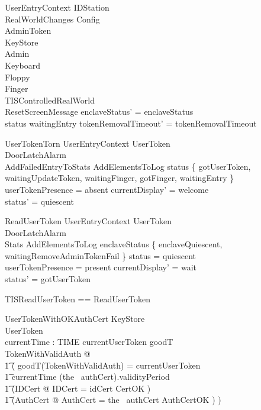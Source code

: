 \begin{schema}{UserEntryContext}
        \Delta IDStation
\\      RealWorldChanges
\also
        \Xi Config
\\      \Xi AdminToken
\\      \Xi KeyStore
\\      \Xi Admin
\\      \Xi Keyboard
\\      \Xi Floppy
\\      \Xi Finger
\also
\\      \Xi TISControlledRealWorld
\also
\\      ResetScreenMessage
\where
        enclaveStatus' = enclaveStatus
\\      status \neq waitingEntry \implies tokenRemovalTimeout' = tokenRemovalTimeout
\end{schema} 

\begin{schema}{UserTokenTorn}
        UserEntryContext
\also
	\Xi UserToken
\\      \Xi DoorLatchAlarm
\\      AddFailedEntryToStats
\also
        AddElementsToLog     
\where
        status \in \{ gotUserToken, waitingUpdateToken,
waitingFinger, gotFinger, waitingEntry \}
\\      userTokenPresence = absent
\also
        currentDisplay' = welcome
\\      status' = quiescent 
\end{schema}

\begin{schema}{ReadUserToken}
        UserEntryContext
\also
        \Xi UserToken
\\	\Xi DoorLatchAlarm
\\      \Xi Stats
\also
        AddElementsToLog
\where
        enclaveStatus \in \{ enclaveQuiescent,
        waitingRemoveAdminTokenFail \}
\also
	status = quiescent
\\	userTokenPresence = present
\also
	currentDisplay' = wait
\\	status' = gotUserToken
\end{schema}

\begin{zed}
        TISReadUserToken ==  ReadUserToken
\end{zed}

\begin{schema}{UserTokenWithOKAuthCert}
        KeyStore
\\      UserToken
\\      currentTime : TIME
\where
        currentUserToken \in \ran goodT
\\	\exists TokenWithValidAuth @ 
\\ \t1		(
		goodT(\theta TokenWithValidAuth) = currentUserToken
\\ \t1		\land currentTime \in (the~ authCert).validityPeriod
\\ \t1          \land (\exists IDCert @ \theta IDCert = idCert \land CertOK )
\\ \t1          \land (\exists AuthCert @ \theta AuthCert = the~
authCert \land AuthCertOK )  
		)
\end{schema}

